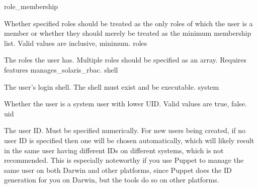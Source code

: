role_membership

Whether specified roles should be treated as the only roles of which the user is a member or whether they should merely be treated as the minimum membership list. Valid values are inclusive, minimum.
roles

The roles the user has. Multiple roles should be specified as an array. Requires features manages_solaris_rbac.
shell

The user’s login shell. The shell must exist and be executable.
system

Whether the user is a system user with lower UID. Valid values are true, false.
uid

The user ID. Must be specified numerically. For new users being created, if no user ID is specified then one will be chosen automatically, which will likely result in the same user having different IDs on different systems, which is not recommended. This is especially noteworthy if you use Puppet to manage the same user on both Darwin and other platforms, since Puppet does the ID generation for you on Darwin, but the tools do so on other platforms.
